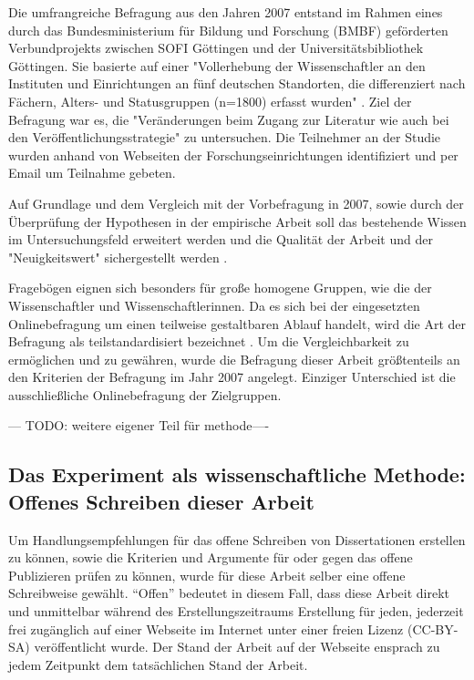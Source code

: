 Die umfrangreiche Befragung aus den Jahren 2007 entstand im Rahmen eines durch das Bundesministerium für Bildung und Forschung (BMBF) geförderten Verbundprojekts zwischen SOFI Göttingen und der Universitätsbibliothek Göttingen. Sie basierte auf einer "Vollerhebung der Wissenschaftler an den Instituten und Einrichtungen an fünf deutschen Standorten, die differenziert nach Fächern, Alters- und Statusgruppen (n=1800) erfasst wurden" \cite{Hanekop_2014}. Ziel der Befragung war es, die "Veränderungen beim Zugang zur Literatur wie auch bei den Veröffentlichungsstrategie" \cite{Hanekop_Wittke_2007_Fragebogen} zu untersuchen. Die Teilnehmer an der Studie wurden anhand von Webseiten der Forschungseinrichtungen identifiziert und per Email um Teilnahme gebeten. 

Auf Grundlage und dem Vergleich mit der Vorbefragung in 2007, sowie durch der Überprüfung der Hypothesen in der empirische Arbeit soll das bestehende Wissen im Untersuchungsfeld erweitert werden und die Qualität der Arbeit und der "Neuigkeitswert" sichergestellt werden \cite{raab_2012_fragebogen}.

Fragebögen eignen sich besonders für große homogene Gruppen, wie die der Wissenschaftler und Wissenschaftlerinnen. Da es sich bei der eingesetzten Onlinebefragung um einen teilweise gestaltbaren Ablauf handelt, wird die Art der Befragung als teilstandardisiert bezeichnet \cite{raab_2012_fragebogen}. Um die Vergleichbarkeit zu ermöglichen und zu gewähren, wurde die Befragung dieser Arbeit größtenteils an den Kriterien der Befragung im Jahr 2007 angelegt. Einziger Unterschied ist die ausschließliche Onlinebefragung der Zielgruppen.

--- TODO: weitere eigener Teil für methode----

\subsection{Das Experiment als wissenschaftliche Methode: Offenes Schreiben dieser Arbeit}

Um Handlungsempfehlungen für das offene Schreiben von Dissertationen erstellen zu können, sowie die Kriterien und Argumente für oder gegen das offene Publizieren prüfen zu können, wurde für diese Arbeit selber eine offene Schreibweise gewählt. “Offen” bedeutet in diesem Fall, dass diese Arbeit direkt und unmittelbar während des Erstellungszeitraums Erstellung für jeden, jederzeit frei zugänglich auf einer Webseite im Internet unter einer freien Lizenz (CC-BY-SA) veröffentlicht wurde. Der Stand der Arbeit auf der Webseite ensprach zu jedem Zeitpunkt dem tatsächlichen Stand der Arbeit. 

